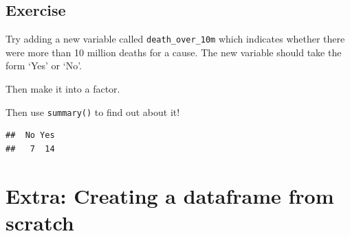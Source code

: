 \documentclass[12pt,]{krantz}
\makeatletter
\newenvironment{Shaded}{\begin{snugshade}}{\end{snugshade}}
\newcommand{\CommentTok}[1]{\textcolor[rgb]{0.56,0.35,0.01}{\textit{#1}}}
\newcommand{\DataTypeTok}[1]{\textcolor[rgb]{0.13,0.29,0.53}{#1}}
\newcommand{\DecValTok}[1]{\textcolor[rgb]{0.00,0.00,0.81}{#1}}
\newcommand{\KeywordTok}[1]{\textcolor[rgb]{0.13,0.29,0.53}{\textbf{#1}}}
\newcommand{\NormalTok}[1]{#1}
\newcommand{\OperatorTok}[1]{\textcolor[rgb]{0.81,0.36,0.00}{\textbf{#1}}}
\newcommand{\StringTok}[1]{\textcolor[rgb]{0.31,0.60,0.02}{#1}}
\newenvironment{kframe}{%
\medskip{}
\setlength{\fboxsep}{.8em}
 \def\at@end@of@kframe{}%
 \ifinner\ifhmode%
  \def\at@end@of@kframe{\end{minipage}}%
  \begin{minipage}{\columnwidth}%
 \fi\fi%
 \def\FrameCommand##1{\hskip\@totalleftmargin \hskip-\fboxsep
 \colorbox{shadecolor}{##1}\hskip-\fboxsep
     \hskip-\linewidth \hskip-\@totalleftmargin \hskip\columnwidth}%
 \MakeFramed {\advance\hsize-\width
   \@totalleftmargin\z@ \linewidth\hsize
   \@setminipage}}%
 {\par\unskip\endMakeFramed%
 \at@end@of@kframe}
\renewenvironment{Shaded}{\begin{kframe}}{\end{kframe}}
\theoremstyle{definition}
\theoremstyle{definition}
\theoremstyle{definition}
\theoremstyle{remark}
\makeatother
\begin{document}
\begin{Shaded}
\end{Shaded}

\hypertarget{exercise-9}{%
\subsection{Exercise}\label{exercise-9}}

Try adding a new variable called \texttt{death\_over\_10m} which
indicates whether there were more than 10 million deaths for a cause.
The new variable should take the form `Yes' or `No'.

Then make it into a factor.

Then use \texttt{summary()} to find out about it!

\begin{Shaded}
\end{Shaded}

\begin{verbatim}
##  No Yes 
##   7  14
\end{verbatim}

\hypertarget{extra-creating-a-dataframe-from-scratch}{%
\section{Extra: Creating a dataframe from
scratch}\label{extra-creating-a-dataframe-from-scratch}}
\end{document}
